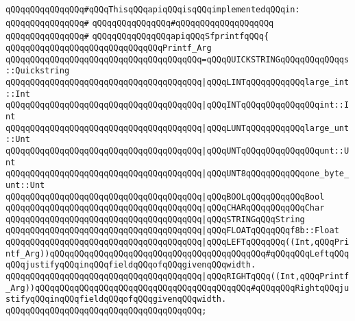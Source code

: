 \newline
\verb|qQQqqQQqqQQqqQQq#qQQqThisqQQqapiqQQqisqQQqimplementedqQQqin:|\newline
\verb|qQQqqQQqqQQqqQQq#|\newline
\verb|qQQqqQQqqQQqqQQq#qQQqqQQqqQQqqQQqqQQq|\newline
\verb|qQQqqQQqqQQqqQQq#|\newline
\verb|qQQqqQQqqQQqqQQqapiqQQqSfprintfqQQq{|\newline
\newline
\verb|qQQqqQQqqQQqqQQqqQQqqQQqqQQqqQQqPrintf_Arg|\newline
\verb|qQQqqQQqqQQqqQQqqQQqqQQqqQQqqQQqqQQqqQQq=qQQqQUICKSTRINGqQQqqQQqqQQqqs::Quickstring|\newline
\verb|qQQqqQQqqQQqqQQqqQQqqQQqqQQqqQQqqQQqqQQq|\verb#|qQQqLINTqQQqqQQqqQQqlarge_int::Int#\newline
\verb|qQQqqQQqqQQqqQQqqQQqqQQqqQQqqQQqqQQqqQQq|\verb#|qQQqINTqQQqqQQqqQQqqQQqint::Int#\newline
\verb|qQQqqQQqqQQqqQQqqQQqqQQqqQQqqQQqqQQqqQQq|\verb#|qQQqLUNTqQQqqQQqqQQqlarge_unt::Unt#\newline
\verb|qQQqqQQqqQQqqQQqqQQqqQQqqQQqqQQqqQQqqQQq|\verb#|qQQqUNTqQQqqQQqqQQqqQQqunt::Unt#\newline
\verb|qQQqqQQqqQQqqQQqqQQqqQQqqQQqqQQqqQQqqQQq|\verb#|qQQqUNT8qQQqqQQqqQQqone_byte_unt::Unt#\newline
\verb|qQQqqQQqqQQqqQQqqQQqqQQqqQQqqQQqqQQqqQQq|\verb#|qQQqBOOLqQQqqQQqqQQqBool#\newline
\verb|qQQqqQQqqQQqqQQqqQQqqQQqqQQqqQQqqQQqqQQq|\verb#|qQQqCHARqQQqqQQqqQQqChar#\newline
\verb|qQQqqQQqqQQqqQQqqQQqqQQqqQQqqQQqqQQqqQQq|\verb#|qQQqSTRINGqQQqString#\newline
\verb|qQQqqQQqqQQqqQQqqQQqqQQqqQQqqQQqqQQqqQQq|\verb#|qQQqFLOATqQQqqQQqf8b::Float#\newline
\verb|qQQqqQQqqQQqqQQqqQQqqQQqqQQqqQQqqQQqqQQq|\verb#|qQQqLEFTqQQqqQQq((Int,qQQqPrintf_Arg))qQQqqQQqqQQqqQQqqQQqqQQqqQQqqQQqqQQqqQQqqQQq#\verb|#qQQqqQQqLeftqQQqqQQqjustifyqQQqinqQQqfieldqQQqofqQQqgivenqQQqwidth.|\newline
\verb|qQQqqQQqqQQqqQQqqQQqqQQqqQQqqQQqqQQqqQQq|\verb#|qQQqRIGHTqQQq((Int,qQQqPrintf_Arg))qQQqqQQqqQQqqQQqqQQqqQQqqQQqqQQqqQQqqQQqqQQq#\verb|#qQQqqQQqRightqQQqjustifyqQQqinqQQqfieldqQQqofqQQqgivenqQQqwidth.|\newline
\verb|qQQqqQQqqQQqqQQqqQQqqQQqqQQqqQQqqQQqqQQq;|\newline
